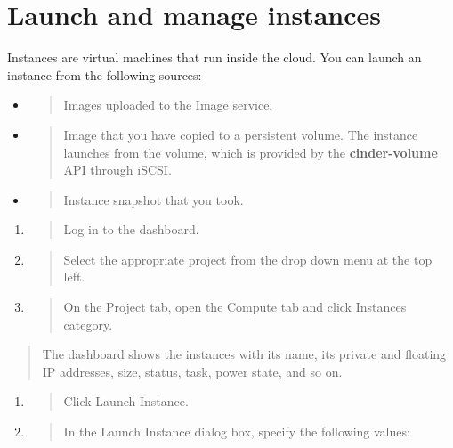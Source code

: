 \chapter{Launch and manage instances}

Instances are virtual machines that run inside the cloud. You can launch
an \gls{instance} from the following sources:

\begin{itemize}
\item
  \begin{quote}
  Images uploaded to the Image service.
  \end{quote}
\item
  \begin{quote}
  Image that you have copied to a persistent volume. The instance
  launches from the volume, which is provided by the
  \textbf{cinder-volume} API through iSCSI.
  \end{quote}
\item
  \begin{quote}
  Instance snapshot that you took.
  \end{quote}
\end{itemize}

\label{launch-an-instance}

\begin{enumerate}
\def\labelenumi{\arabic{enumi}.}
\item
  \begin{quote}
  Log in to the dashboard.
  \end{quote}
\item
  \begin{quote}
  Select the appropriate project from the drop down menu at the top
  left.
  \end{quote}
\item
  \begin{quote}
  On the Project tab, open the Compute tab and click Instances category.
  \end{quote}
\end{enumerate}

\begin{quote}
The dashboard shows the instances with its name, its private and
floating IP addresses, size, status, task, power state, and so on.
\end{quote}

\begin{enumerate}
\def\labelenumi{\arabic{enumi}.}
\item
  \begin{quote}
  Click Launch Instance.
  \end{quote}
\item
  \begin{quote}
  In the Launch Instance dialog box, specify the following values:
  \end{quote}
\end{enumerate}

